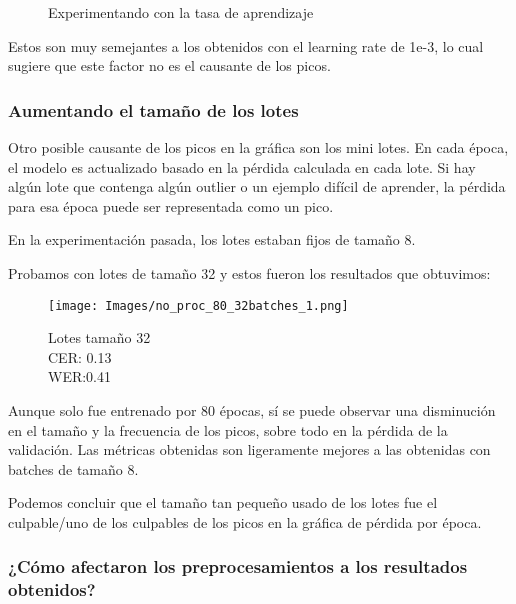 \documentclass{article}
\begin{document}
\begin{figure}[h]%
    \centering
    \qquad
    \caption{Experimentando con la tasa de aprendizaje}%
    \label{fig:example}%
\end{figure}

Estos son muy semejantes a los obtenidos con el learning rate de 1e-3, lo cual sugiere que este factor no es el causante de los picos.

\subsubsection{Aumentando el tamaño de los lotes}
Otro posible causante de los picos en la gráfica son los mini lotes. 
En cada época, el modelo es actualizado basado en la pérdida calculada en cada lote. Si hay algún lote que contenga algún outlier o un ejemplo difícil de aprender, la pérdida para esa época puede ser representada como un pico.

En la experimentación pasada, los lotes estaban fijos de tamaño 8.

Probamos con lotes de tamaño 32 y estos fueron los resultados que obtuvimos:

\begin{figure}[H]
    \centering
    \texttt{[image: Images/no\_proc\_80\_32batches\_1.png]}
    \caption{Lotes tamaño 32\\CER: 0.13\\WER:0.41}
    \label{fig:enter-label}
\end{figure}
Aunque solo fue entrenado por 80 épocas, sí se puede observar una disminución en el tamaño y la frecuencia de los picos, sobre todo en la pérdida de la validación. 
Las métricas obtenidas son ligeramente mejores a las obtenidas con batches de
tamaño 8.

Podemos concluir que el tamaño tan pequeño usado de los lotes fue el culpable/uno de los culpables de los picos en la gráfica de pérdida por época.
\subsubsection{¿Cómo afectaron los preprocesamientos a los resultados obtenidos?}
\end{document}
